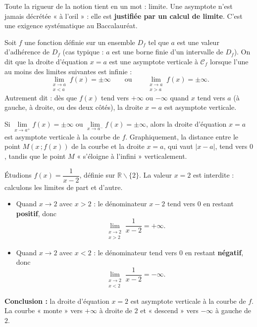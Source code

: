 \documentclass[11pt]{article}
\newcommand{\cle}[1]{{\popxbold\color{popdark}#1}}
\newcounter{popsec}
\newcounter{popsub}
\newcommand{\courssub}[1]{%
  \stepcounter{popsub}%
  \par\vspace{9pt}\noindent{\popxbold\fontsize{11.5}{13}\selectfont\color{popink}{\color{poporange}\thepopsec.\thepopsub}\hspace{6pt}#1}\par\nopagebreak\vspace{4pt}
}
\def\setminus{\mathbin{\backslash}}\let\smallsetminus\setminus
\begin{document}
Toute la rigueur de la notion tient en un mot : \cle{limite}. Une asymptote n'est jamais décrétée « à l'œil » : elle est \textbf{justifiée par un calcul de limite}. C'est une exigence systématique au Baccalauréat.

\courssub{Asymptote verticale}

\begin{definition}
Soit $f$ une fonction définie sur un ensemble $D_f$ tel que $a$ est une valeur d'adhérence de $D_f$ (cas typique : $a$ est une borne finie d'un intervalle de $D_f$). On dit que la droite d'équation $x = a$ est une \cle{asymptote verticale} à $\mathcal{C}_f$ lorsque l'une au moins des limites suivantes est infinie :
\[
\lim_{\substack{x \to a \\ x < a}} f(x) = \pm\infty
\qquad\text{ou}\qquad
\lim_{\substack{x \to a \\ x > a}} f(x) = \pm\infty .
\]
Autrement dit : dès que $f(x)$ tend vers $+\infty$ ou $-\infty$ quand $x$ tend vers $a$ (à gauche, à droite, ou des deux côtés), la droite $x = a$ est asymptote verticale.
\end{definition}

\begin{propriete}
Si $\lim\limits_{x \to a^+} f(x) = \pm\infty$ ou $\lim\limits_{x \to a^-} f(x) = \pm\infty$, alors la droite d'équation $x = a$ est asymptote verticale à la courbe de $f$. Graphiquement, la distance entre le point $M(x\,;f(x))$ de la courbe et la droite $x = a$, qui vaut $|x - a|$, tend vers $0$, tandis que le point $M$ « s'éloigne à l'infini » verticalement.
\end{propriete}

\begin{exemplebox}
Étudions $f(x) = \dfrac{1}{x-2}$, définie sur $\mathbb{R}\setminus\{2\}$. La valeur $x = 2$ est interdite : calculons les limites de part et d'autre.
\begin{itemize}
\item Quand $x \to 2$ avec $x > 2$ : le dénominateur $x - 2$ tend vers $0$ en restant \textbf{positif}, donc
\[ \lim_{\substack{x \to 2 \\ x > 2}} \frac{1}{x-2} = +\infty . \]
\item Quand $x \to 2$ avec $x < 2$ : le dénominateur tend vers $0$ en restant \textbf{négatif}, donc
\[ \lim_{\substack{x \to 2 \\ x < 2}} \frac{1}{x-2} = -\infty . \]
\end{itemize}
\textbf{Conclusion :} la droite d'équation $x = 2$ est asymptote verticale à la courbe de $f$. La courbe « monte » vers $+\infty$ à droite de $2$ et « descend » vers $-\infty$ à gauche de $2$.
\end{exemplebox}
\end{document}

